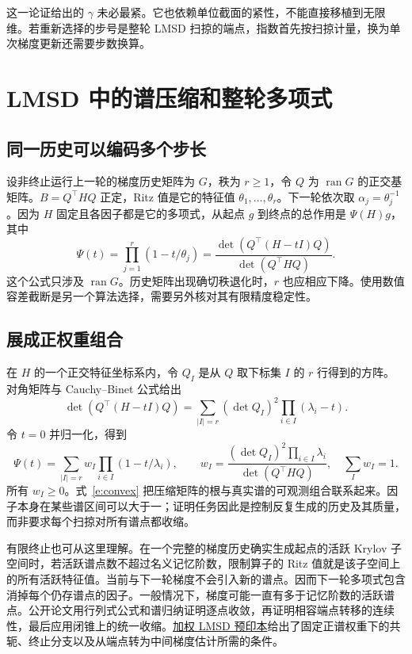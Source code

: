 \documentclass[UTF8,zihao=-4,a4paper]{ctexart}
\begin{document}
这一论证给出的 $\gamma$ 未必最紧。它也依赖单位截面的紧性，不能直接移植到无限维。若重新选择的步号是整轮 LMSD 扫掠的端点，指数首先按扫掠计量，换为单次梯度更新还需要步数换算。

\section{LMSD 中的谱压缩和整轮多项式}

\subsection{同一历史可以编码多个步长}

设非终止运行上一轮的梯度历史矩阵为 $G$，秩为 $r\ge1$，令 $Q$ 为 $\operatorname{ran}G$ 的正交基矩阵。$B=Q^\top HQ$ 正定，Ritz 值是它的特征值 $\theta_1,\ldots,\theta_r$。下一轮依次取 $\alpha_j=\theta_j^{-1}$。因为 $H$ 固定且各因子都是它的多项式，从起点 $g$ 到终点的总作用是 $\Psi(H)g$，其中
\[
 \Psi(t)=\prod_{j=1}^{r}(1-t/\theta_j)
 =\frac{\det(Q^\top(H-tI)Q)}{\det(Q^\top HQ)}.
\]
这个公式只涉及 $\operatorname{ran}G$。历史矩阵出现确切秩退化时，$r$ 也应相应下降。使用数值容差截断是另一个算法选择，需要另外核对其有限精度稳定性。

\subsection{展成正权重组合}

在 $H$ 的一个正交特征坐标系内，令 $Q_I$ 是从 $Q$ 取下标集 $I$ 的 $r$ 行得到的方阵。对角矩阵与 Cauchy--Binet 公式给出
\[
 \det(Q^\top(H-tI)Q)=\sum_{|I|=r}(\det Q_I)^2\prod_{i\in I}(\lambda_i-t).
\]
令 $t=0$ 并归一化，得到
\begin{equation}\label{e:convex}
 \Psi(t)=\sum_{|I|=r}w_I
              \prod_{i\in I}(1-t/\lambda_i),\qquad
 w_I=\frac{(\det Q_I)^2\prod_{i\in I}\lambda_i}{\det(Q^\top HQ)},\quad
 \sum_I w_I=1 .
\end{equation}
所有 $w_I\ge0$。式~\eqref{e:convex} 把压缩矩阵的根与真实谱的可观测组合联系起来。因子本身在某些谱区间可以大于一；证明任务因此是控制反复生成的历史及其质量，而非要求每个扫掠对所有谱点都收缩。

有限终止也可从这里理解。在一个完整的梯度历史确实生成起点的活跃 Krylov 子空间时，若活跃谱点数不超过名义记忆阶数，限制算子的 Ritz 值就是该子空间上的所有活跃特征值。当前与下一轮梯度不会引入新的谱点。因而下一轮多项式包含消掉每个仍存谱点的因子。一般情况下，梯度可能一直有多于记忆阶数的活跃谱点。公开论文用行列式公式和谱归纳证明逐点收敛，再证明相容端点转移的连续性，最后应用闭锥上的统一收缩。\href{https://arxiv.org/abs/2609.12114}{加权 LMSD 预印本}给出了固定正谱权重下的共轭、终止分支以及从端点转为中间梯度估计所需的条件。
\end{document}
